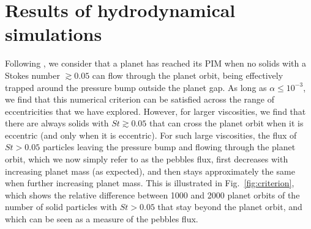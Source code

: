 \documentclass[fleqn,usenatbib]{mnras}
\begin{document}
\section{Results of hydrodynamical simulations}
\label{sec:results}
Following \citet{Ataiee_etal2018}, we consider that a planet has reached its PIM when no solids with a Stokes number $\gtrsim 0.05$ can flow through the planet orbit, being effectively trapped around the pressure bump outside the planet gap. As long as $\alpha\leq10^{-3}$, we find that this numerical criterion can be satisfied across the range of eccentricities that we have explored. However, for larger viscosities, we find that there are always solids with $St \gtrsim 0.05$ that can cross the planet orbit when it is eccentric (and only when it is eccentric). For such large viscosities, the flux of $St>0.05$ particles leaving the pressure bump and flowing through the planet orbit, which we now simply refer to as the pebbles flux, first decreases with increasing planet mass (as expected), and then stays approximately the same when further increasing planet mass. This is illustrated in Fig.~\ref{fig:criterion}, which shows the relative difference between 1000 and 2000 planet orbits of the number of solid particles with $St >0.05$ that stay beyond the planet orbit, and which can be seen as a measure of the pebbles flux.
\end{document}
